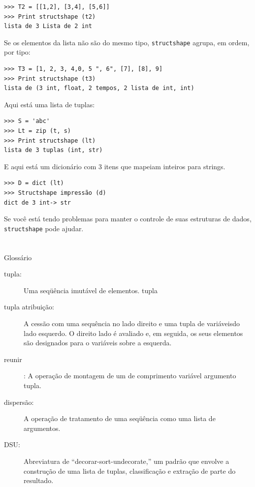 \documentclass[10pt]{book}
\begin{document}
\begin{exercise}
\begin{v erbatim}
\begin{verbatim}
>>> T2 = [[1,2], [3,4], [5,6]]
>>> Print structshape (t2)
lista de 3 Lista de 2 int
\end{verbatim}
%
Se os elementos da lista não são do mesmo tipo,
{\tt structshape} agrupa, em ordem, por tipo:

\begin{verbatim}
>>> T3 = [1, 2, 3, 4,0, 5 ", 6", [7], [8], 9]
>>> Print structshape (t3)
lista de (3 int, float, 2 tempos, 2 lista de int, int)
\end{verbatim}
%
Aqui está uma lista de tuplas:

\begin{verbatim}
>>> S = 'abc'
>>> Lt = zip (t, s)
>>> Print structshape (lt)
lista de 3 tuplas (int, str)
\end{verbatim}
%
E aqui está um dicionário com 3 itens que mapeiam inteiros para strings.

\begin{verbatim}
>>> D = dict (lt) 
>>> Structshape impressão (d)
dict de 3 int-> str
\end{verbatim}
%
Se você está tendo problemas para manter o controle de suas estruturas de dados,
{\tt structshape} pode ajudar.


\section{} Glossário

\begin{description}

\item[tupla:] Uma seqüência imutável de elementos.
\index{} tupla

\item[tupla atribuição:] A cessão com uma sequência no
lado direito e uma tupla de variáveis ​​do lado esquerdo. O direito
lado é avaliado e, em seguida, os seus elementos são designados para o
variáveis ​​sobre a esquerda.

\item[reunir]: A operação de montagem de um de comprimento variável
argumento tupla.

\item[dispersão:] A operação de tratamento de uma seqüência como uma lista de
argumentos.

\item[DSU:] Abreviatura de ``decorar-sort-undecorate,'' um
padrão que envolve a construção de uma lista de tuplas, classificação e
extração de parte do resultado.


\end{description}
\end{v erbatim}
\end{exercise}
\end{document}

